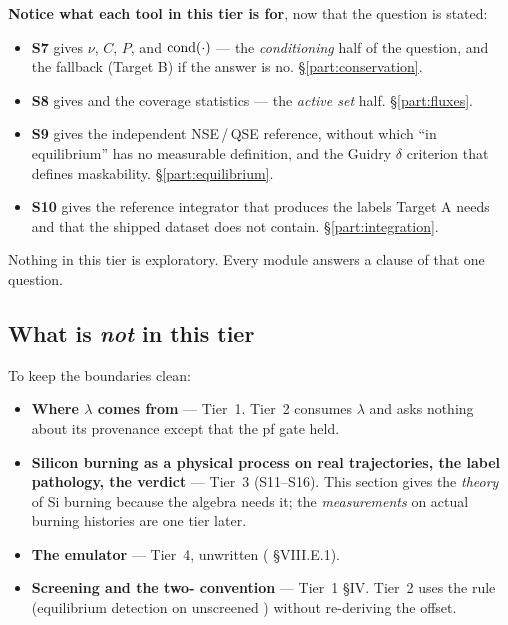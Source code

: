 \textbf{Notice what each tool in this tier is for}, now that the question is
stated:

\begin{itemize}
\item \textbf{S7} gives $\nu$, $C$, $P$, and $\operatorname{cond}(\cdot)$ --- the
  \emph{conditioning} half of the question, and the fallback (Target B) if the
  answer is no. \S\ref{part:conservation}.
\item \textbf{S8} gives \kap{} and the coverage statistics --- the \emph{active
  set} half. \S\ref{part:fluxes}.
\item \textbf{S9} gives the independent NSE\,/\,QSE reference, without which
  ``in equilibrium'' has no measurable definition, and the Guidry $\delta$
  criterion that defines maskability. \S\ref{part:equilibrium}.
\item \textbf{S10} gives the reference integrator that produces the \Phifl{}
  labels Target A needs and that the shipped dataset does not contain.
  \S\ref{part:integration}.
\end{itemize}

Nothing in this tier is exploratory. Every module answers a clause of that one
question.

\subsection{What is \emph{not} in this tier}
\label{sec:scope}

To keep the boundaries clean:

\begin{itemize}
\item \textbf{Where $\lambda$ comes from} --- Tier~1. Tier~2 consumes $\lambda$
  and asks nothing about its provenance except that the pf gate held.
\item \textbf{Silicon burning as a physical process on real trajectories, the
  label pathology, the verdict} --- Tier~3 (S11--S16). This section gives the
  \emph{theory} of Si burning because the algebra needs it; the
  \emph{measurements} on actual burning histories are one tier later.
\item \textbf{The emulator} --- Tier~4, unwritten ( \S VIII.E.1).
\item \textbf{Screening and the two-\kap{} convention} --- Tier~1 \S IV. Tier~2
  uses the rule (equilibrium detection on unscreened \kap) without re-deriving
  the offset.
\end{itemize}

